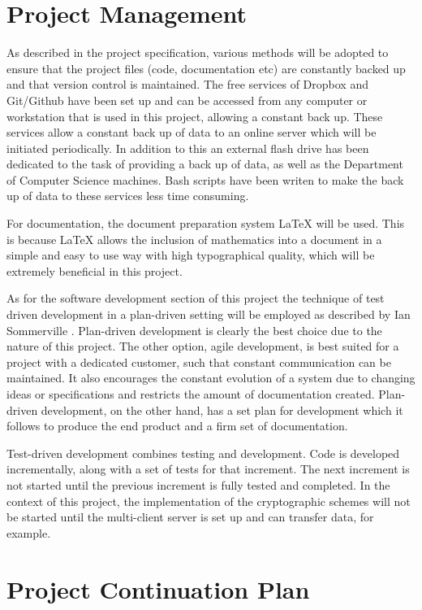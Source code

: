\documentclass[a4paper,11pt]{article}
\begin{document}
\section{Project Management}

As described in the project specification, various methods will be adopted to ensure that the project files (code, documentation etc) are constantly backed up and that version control is maintained. The free services of Dropbox\cite{dropbox} and Git/Github\cite{github} have been set up and can be accessed from any computer or workstation that is used in this project, allowing a constant back up. These services allow a constant back up of data to an online server which will be initiated periodically. In addition to this an external flash drive has been dedicated to the task of providing a back up of data, as well as the Department of Computer Science machines. Bash scripts have been writen to make the back up of data to these services less time consuming.

For documentation, the document preparation system LaTeX will be used. This is because LaTeX allows the inclusion of mathematics into a document in a simple and easy to use way with high typographical quality, which will be extremely beneficial in this project. 

As for the software development section of this project the technique of test driven development in a plan-driven setting will be employed as described by Ian Sommerville \cite{iansommerville}. Plan-driven development is clearly the best choice due to the nature of this project. The other option, agile development, is best suited for a project with a dedicated customer, such that constant communication can be maintained. It also encourages the constant evolution of a system due to changing ideas or specifications and restricts the amount of documentation created. Plan-driven development, on the other hand, has a set plan for development which it follows to produce the end product and a firm set of documentation. 

Test-driven development combines testing and development. Code is developed incrementally, along with a set of tests for that increment. The next increment is not started until the previous increment is fully tested and completed. In the context of this project, the implementation of the cryptographic schemes will not be started until the multi-client server is set up and can transfer data, for example. 

\section{Project Continuation Plan}
\end{document}
